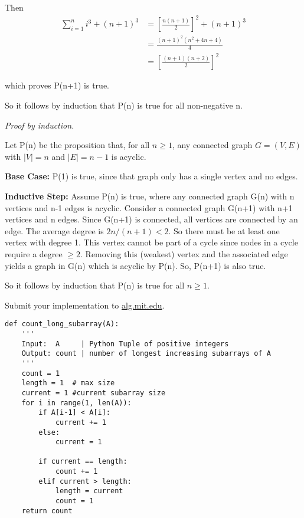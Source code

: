 \documentclass[12pt,twoside]{article}
\renewcommand{\qed}{\hfill\blacksquare}
\begin{document}
\begin{problems}
Then
\[
	\begin{split}
		\sum_{i=1}^n i^3 + (n+1)^3  &= \left[ \frac{n(n+1)}{2} \right]^2 + (n+1)^3 \\
			&= \frac{(n+1)^2(n^2 + 4n + 4)}{4} \\
			&= \left[ \frac{(n+1)(n+2)}{2} \right]^2
	\end{split}
\]

which proves P(n+1) is true.

So it follows by induction that P(n) is true for all non-negative n. \qed

\newpage

\problem  %
	\textit{Proof by induction.}
	
	Let P(n) be the proposition that, for all \( n \geq 1\), any connected graph \(G = (V,E)\) with \(|V| = n\) and \(|E| = n-1\) is acyclic.
	
	\textbf{Base Case:} P(1) is true, since that graph only has a single vertex and no edges. 
	
	\textbf{Inductive Step:} Assume P(n) is true, where any connected graph G(n) with n vertices and n-1 edges is acyclic. Consider a connected graph G(n+1) with n+1 vertices and n edges. Since G(n+1) is connected, all vertices are connected by an edge. The average degree is \(2n/(n+1) < 2\). So there must be at least one vertex with degree 1. This vertex cannot be part of a cycle since nodes in a cycle require a degree \( \geq 2\). Removing this (weakest) vertex and the associated edge yields a graph in G(n) which is acyclic by P(n). So, P(n+1) is also true.
	
	So it follows by induction that P(n) is true for all \( n \geq 1 \). \qed
\vfill

\problem  %
Submit your implementation to {\small\url{alg.mit.edu}}.

\begin{lstlisting}
def count_long_subarray(A):
    '''
    Input:  A     | Python Tuple of positive integers
    Output: count | number of longest increasing subarrays of A
    '''
    count = 1
    length = 1 	# max size
    current = 1 #current subarray size
    for i in range(1, len(A)):
        if A[i-1] < A[i]:
            current += 1
        else:
            current = 1
            
        if current == length:
            count += 1
        elif current > length:
            length = current
            count = 1
    return count
    
\end{lstlisting}

\end{problems}
\end{document}
